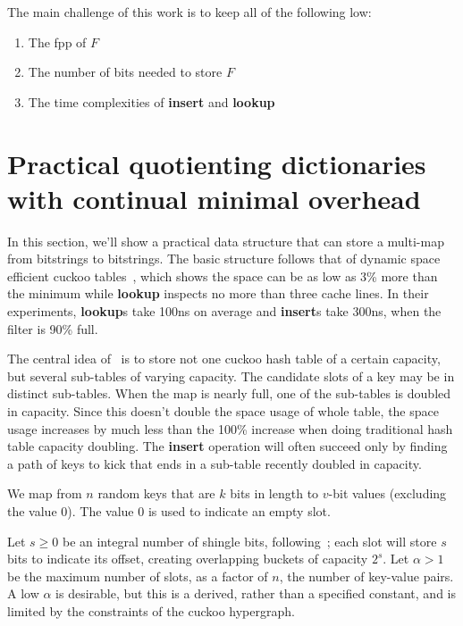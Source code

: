 \documentclass[11pt,letterpaper]{article}
\begin{document}
The main challenge of this work is to keep all of the following low:

\begin{enumerate}
\item The fpp of $F$
\item The number of bits needed to store $F$
\item The time complexities of {\bf insert} and {\bf lookup}
\end{enumerate}

\section{Practical quotienting dictionaries with continual minimal overhead}

In this section, we'll show a practical data structure that can store a multi-map from bitstrings to bitstrings.
The basic structure follows that of dynamic space efficient cuckoo tables~\cite{maier2019dynamic}, which shows the space can be as low as 3\% more than the minimum while {\bf lookup} inspects no more than three cache lines.
In their experiments, {\bf lookup}s take 100ns on average and {\bf insert}s take 300ns, when the filter is 90\% full.

The central idea of~\cite{maier2019dynamic} is to store not one cuckoo hash table of a certain capacity, but several sub-tables of varying capacity.
The candidate slots of a key may be in distinct sub-tables.
When the map is nearly full, one of the sub-tables is doubled in capacity.
Since this doesn't double the space usage of whole table, the space usage increases by much less than the 100\% increase when doing traditional hash table capacity doubling.
The {\bf insert} operation will often succeed only by finding a path of keys to kick that ends in a sub-table recently doubled in capacity.

We map from $n$ random keys that are $k$ bits in length to $v$-bit values (excluding the value $0$).
The value $0$ is used to indicate an empty slot.

Let $s \geq 0$ be an integral number of shingle bits, following~\cite{lehman20093}; each slot will store $s$ bits to indicate its offset, creating overlapping buckets of capacity $2^s$.
Let $\alpha > 1$ be the maximum number of slots, as a factor of $n$, the number of key-value pairs.
A low $\alpha$ is desirable, but this is a derived, rather than a specified constant, and is limited by the constraints of the cuckoo hypergraph.
\end{document}

